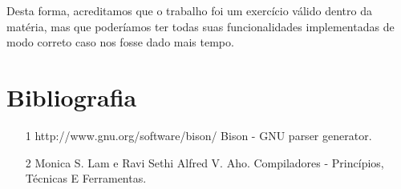 \documentclass[a4paper,12pt]{article}
\begin{document}
Desta forma, acreditamos que o trabalho foi um exercício válido dentro da matéria, mas que poderíamos ter todas suas funcionalidades implementadas de modo correto caso nos fosse dado mais tempo.

\section{Bibliografia}
\begin{itemize}
 \item [1] http://www.gnu.org/software/bison/ Bison - GNU parser generator.
\item [2] Monica S. Lam e Ravi Sethi Alfred V. Aho. Compiladores - Princípios, Técnicas E Ferramentas.
\end{itemize}
\end{document}
